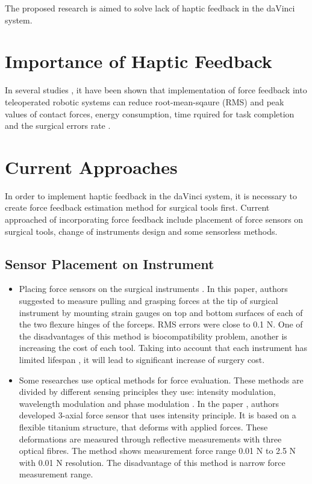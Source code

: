 The proposed research is aimed to solve lack of haptic feedback in the daVinci system.



\section{Importance of Haptic Feedback}
\label{sec:hapticFeedbackImportance}

In several studies \cite{lim_role_2015, alleblas_effects_2017, currie_role_2017}, it have been shown that implementation of force feedback into teleoperated robotic systems can reduce root-mean-sqaure (RMS) and peak values of contact forces, energy consumption, time rquired for task completion and the surgical errors rate \cite{tavakoli_haptics_2008}.

\section{Current Approaches}
\label{sec:CurAppr}

In order to implement haptic feedback in the daVinci system, it is necessary to create force feedback estimation method for surgical tools first. Current approached of incorporating force feedback include placement of force sensors on surgical tools, change of instruments design and some sensorless methods.

\subsection{Sensor Placement on Instrument}
\begin{itemize}
\item Placing force sensors on the surgical instruments \cite{hong_design_2012}. In this paper, authors suggested to measure pulling and grasping forces at the tip of surgical instrument by mounting strain gauges on top and bottom surfaces of each of the two flexure hinges of the forceps. RMS errors were close to 0.1 N. One of the disadvantages of this method is biocompatibility problem, another is increasing the cost of each tool. Taking into account that each instrument has limited lifespan  \cite{ho_health_2011}, it will lead to significant increase of surgery cost.

\item  Some researches use optical methods for force evaluation. These methods are divided by different sensing principles they use: intensity modulation, wavelength modulation and phase modulation \cite{su_fiber_optic_2017}. In the paper \cite{_micro_2004}, authors developed 3-axial force sensor that uses intensity principle. It is based on a flexible titanium structure, that deforms with applied forces. These deformations are measured through reflective measurements with three optical fibres. The method shows measurement force range 0.01 N to 2.5 N with 0.01 N resolution. The disadvantage of this method is narrow force measurement range.
\end{itemize}

